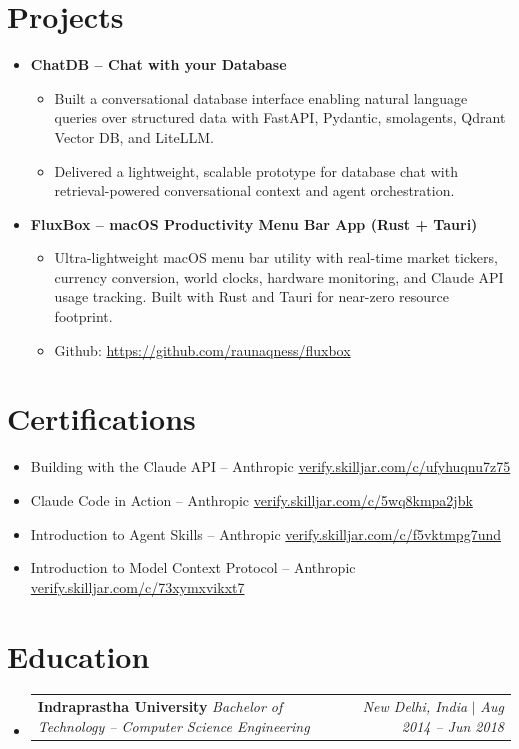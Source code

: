 \documentclass[letterpaper,10pt]{article}
\makeatletter
\newcommand{\resumeItem}[1]{\item\small{#1}}
\newcommand{\resumeSubheading}[4]{
\vspace{-1pt}\item
  \begin{tabular*}{0.97\textwidth}[t]{l@{\extracolsep{\fill}}r}
    \textbf{#1} \hspace{0.4em}\textbar\hspace{0.4em} \textit{#3} & \textit{#4} $|$ \textit{#2} \\
  \end{tabular*}\vspace{-7pt}
}
\newcommand{\resumeSubHeadingList}{\begin{itemize}[leftmargin=0.15in, label={}]}
\newcommand{\resumeSubHeadingListEnd}{\end{itemize}}
\makeatother
\begin{document}
\section{Projects}
\resumeSubHeadingList
  \resumeItem{\textbf{ChatDB -- Chat with your Database}}
  \begin{itemize}[leftmargin=1.4em,label=•,topsep=0pt,partopsep=0pt,parsep=0pt]
      \item \small{Built a conversational database interface enabling natural language queries over structured data with FastAPI, Pydantic, smolagents, Qdrant Vector DB, and LiteLLM.}
      \item \small{Delivered a lightweight, scalable prototype for database chat with retrieval-powered conversational context and agent orchestration.}
  \end{itemize}
  \resumeItem{\textbf{FluxBox -- macOS Productivity Menu Bar App (Rust + Tauri)}}
  \begin{itemize}[leftmargin=1.4em,label=•,topsep=0pt,partopsep=0pt,parsep=0pt]
      \item \small{Ultra-lightweight macOS menu bar utility with real-time market tickers, currency conversion, world clocks, hardware monitoring, and Claude API usage tracking. Built with Rust and Tauri for near-zero resource footprint.}
      \item \small{Github: \href{https://github.com/raunaqness/fluxbox}{https://github.com/raunaqness/fluxbox}}
  \end{itemize}
\resumeSubHeadingListEnd

\section{Certifications}
\begin{itemize}[leftmargin=1.4em,label=•,topsep=0pt,partopsep=0pt,parsep=0pt]
    \item \small{Building with the Claude API -- Anthropic \hfill \href{https://verify.skilljar.com/c/ufyhuqnu7z75}{verify.skilljar.com/c/ufyhuqnu7z75}}
    \item \small{Claude Code in Action -- Anthropic \hfill \href{https://verify.skilljar.com/c/5wq8kmpa2jbk}{verify.skilljar.com/c/5wq8kmpa2jbk}}
    \item \small{Introduction to Agent Skills -- Anthropic \hfill \href{https://verify.skilljar.com/c/f5vktmpg7und}{verify.skilljar.com/c/f5vktmpg7und}}
    \item \small{Introduction to Model Context Protocol -- Anthropic \hfill \href{https://verify.skilljar.com/c/73xymxvikxt7}{verify.skilljar.com/c/73xymxvikxt7}}
\end{itemize}

\section{Education}
\resumeSubHeadingList
  \resumeSubheading
      {Indraprastha University}{Aug 2014 -- Jun 2018}
      {Bachelor of Technology -- Computer Science Engineering}{New Delhi, India}
\resumeSubHeadingListEnd
\end{document}
